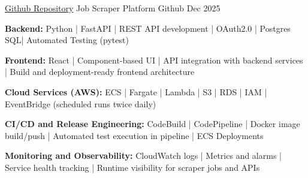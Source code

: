 \vspace{-2mm}


\begin{cventries}

    \cventry
    {\href{https://github.com/moinmalik996/jobs_scrapper_backend}{Github Repository}} %
    {Job Scraper Platform} %
    {Github} %
    {Dec 2025} %
    {
      \begin{cvitems} %
        \setlength{\itemindent}{+.1in}
        \item{\textbf{Backend:} Python | FastAPI | REST API development | OAuth2.0 | Postgres SQL| Automated Testing (pytest)}
        \item{\textbf{Frontend:} React | Component-based UI | API integration with backend services | Build and deployment-ready frontend architecture}
        \item{\textbf{Cloud Services (AWS):} ECS | Fargate | Lambda | S3 | RDS | IAM | EventBridge (scheduled runs twice daily)}
        \item{\textbf{CI/CD and Release Engineering:} CodeBuild | CodePipeline | Docker image build/push | Automated test execution in pipeline | ECS  Deployments}
        \item{\textbf{Monitoring and Observability:} CloudWatch logs | Metrics and alarms | Service health tracking | Runtime visibility for scraper jobs and APIs}
      \end{cvitems}
    }

\end{cventries}
